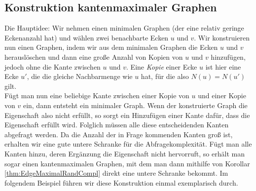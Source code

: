\documentclass[10pt,a4paper]{scrreprt}
\theoremstyle{definition}
\begin{document}
\subsection{Konstruktion kantenmaximaler Graphen}
Die Hauptidee: Wir nehmen einen minimalen Graphen (der eine
relativ geringe Eckenanzahl hat) und wählen zwei benachbarte Ecken
$u$ und $v$. Wir konstruieren nun einen Graphen, indem wir aus dem
minimalen Graphen die Ecken $u$ und $v$ herauslöschen und dann eine große
Anzahl von Kopien von $u$ und $v$ hinzufügen, jedoch ohne die Kante
zwischen $u$ und $v$. Eine \emph{Kopie} einer Ecke $u$ ist hier
eine Ecke $u'$, die die gleiche Nachbarmenge wie $u$ hat, für
die also $N(u)=N(u')$ gilt.\\
Fügt man nun eine beliebige Kante zwischen einer Kopie von $u$ und einer
Kopie von $v$ ein, dann entsteht ein minimaler Graph. Wenn der
konstruierte Graph die Eigenschaft also nicht erfüllt, so sorgt 
ein Hinzufügen einer Kante dafür, dass die Eigenschaft erfüllt wird.
Folglich müssen alle diese entscheidenden Kanten abgefragt werden.
Da die Anzahl der in Frage kommenden Kanten groß ist, erhalten
wir eine gute untere Schranke für die Abfragekomplexität.
Fügt man alle Kanten hinzu, deren Ergänzung die Eigenschaft
nicht hervorruft, so erhält man sogar einen kantenmaximalen Graphen,
mit dem man dann mithilfe von Korollar \ref{thm:EdgeMaximalRandCompl}
direkt eine untere Schranke bekommt.
Im folgendem Beispiel führen wir diese Konstruktion einmal
exemplarisch durch.
\end{document}
